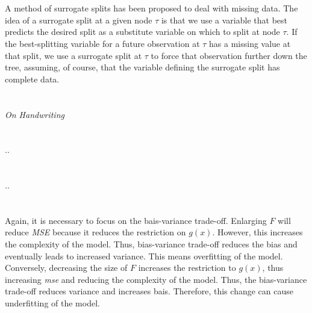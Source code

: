 \documentclass[11pt,a4paper]{article}
\begin{document}
\section{}

A method of surrogate splits has been proposed to deal with missing data. The idea of a surrogate split at a given node \(\tau\) is that we use a variable that best predicts the desired split as a substitute variable on which to split at node \(\tau\). If the best-splitting variable for a future observation at \(\tau\) has a missing value at that split, we use a surrogate split at \(\tau\) to force that observation further down the tree, assuming, of course, that the variable defining the surrogate split has complete data.

\section{}

\emph{On Handwriting}

\section{}

..

\section{}

..

\section{}

Again, it is necessary to focus on the bais-variance trade-off. 
Enlarging \(F\) will reduce \emph{MSE} because it reduces the restriction on \(g(x)\). However, this increases the complexity of the model. Thus, bias-variance trade-off reduces the bias and eventually leads to increased variance. This means overfitting of the model.
Conversely, decreasing the size of \(F\) increases the restriction to \(g(x)\), thus increasing \emph{mse} and reducing the complexity of the model. Thus, the bias-variance trade-off reduces variance and increases bais. Therefore, this change can cause underfitting of the model.

\section{}
\end{document}
